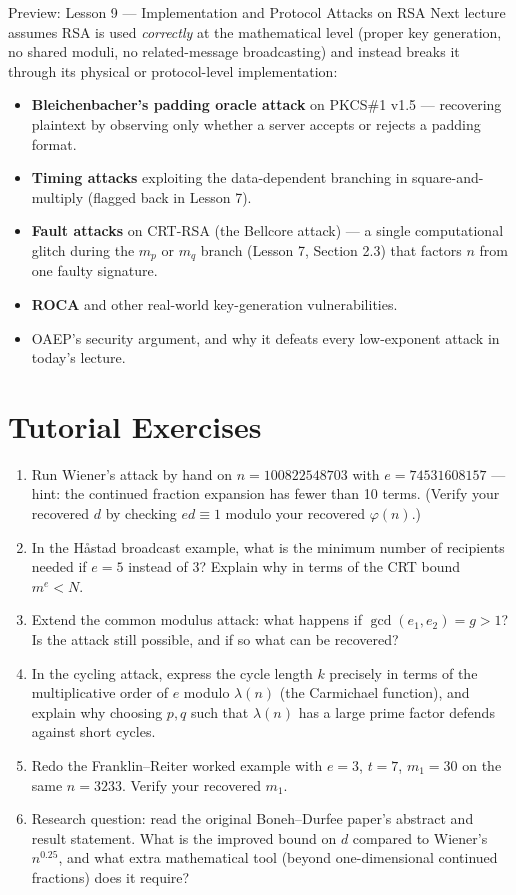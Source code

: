 \begin{warnbox}{Preview: Lesson 9 — Implementation and Protocol Attacks on RSA}
Next lecture assumes RSA is used \emph{correctly} at the mathematical level (proper key generation, no shared moduli, no related-message broadcasting) and instead breaks it through its physical or protocol-level implementation:
\begin{itemize}
\item \textbf{Bleichenbacher's padding oracle attack} on PKCS\#1 v1.5 — recovering plaintext by observing only whether a server accepts or rejects a padding format.
\item \textbf{Timing attacks} exploiting the data-dependent branching in square-and-multiply (flagged back in Lesson 7).
\item \textbf{Fault attacks} on CRT-RSA (the Bellcore attack) — a single computational glitch during the $m_p$ or $m_q$ branch (Lesson 7, Section 2.3) that factors $n$ from one faulty signature.
\item \textbf{ROCA} and other real-world key-generation vulnerabilities.
\item OAEP's security argument, and why it defeats every low-exponent attack in today's lecture.
\end{itemize}
\end{warnbox}

\section*{Tutorial Exercises}
\begin{enumerate}
\item Run Wiener's attack by hand on $n = 100822548703$ with $e = 74531608157$ — hint: the continued fraction expansion has fewer than 10 terms. (Verify your recovered $d$ by checking $ed \equiv 1$ modulo your recovered $\varphi(n)$.)
\item In the Håstad broadcast example, what is the minimum number of recipients needed if $e = 5$ instead of $3$? Explain why in terms of the CRT bound $m^e < N$.
\item Extend the common modulus attack: what happens if $\gcd(e_1,e_2) = g > 1$? Is the attack still possible, and if so what can be recovered?
\item In the cycling attack, express the cycle length $k$ precisely in terms of the multiplicative order of $e$ modulo $\lambda(n)$ (the Carmichael function), and explain why choosing $p,q$ such that $\lambda(n)$ has a large prime factor defends against short cycles.
\item Redo the Franklin--Reiter worked example with $e=3$, $t=7$, $m_1 = 30$ on the same $n=3233$. Verify your recovered $m_1$.
\item Research question: read the original Boneh--Durfee paper's abstract and result statement. What is the improved bound on $d$ compared to Wiener's $n^{0.25}$, and what extra mathematical tool (beyond one-dimensional continued fractions) does it require?
\end{enumerate}
